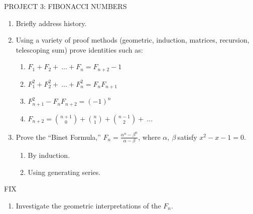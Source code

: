 \documentclass[10pt,letter]{article}
\begin{document}
PROJECT 3: FIBONACCI NUMBERS
\begin{enumerate}
\def\labelenumi{\arabic{enumi}.}

\item
  Briefly address history.
\item
  Using a variety of proof methods (geometric, induction, matrices,
  recursion, telescoping sum) prove identities such as:
\begin{enumerate}
  \def\labelenumii{\alph{enumii}.}

  \item
    \(F_{1} + F_{2} + \ \ldots + F_{n} = F_{n + 2} - 1\)
  \item
    \(F_{1}^{2} + F_{2}^{2} + \ \ldots + F_{n}^{2} = F_{n}F_{n + 1}\)
  \item
    \(F_{n + 1}^{2} - F_{n}F_{n + 2} = \left( - 1 \right)^{n}\)
  \item
    \(F_{n + 2} =
\binom{n + 1}{0}
 +
\binom{n}{1}
 +
\binom{n - 1}{2}
 + \ \ldots\)

\end{enumerate}
\item
  Prove the ``Binet Formula,''
  \(F_{n} = \frac{\alpha^{n} - \beta^{n}}{\alpha - \beta}\), where
  \(\alpha,\ \beta\ \)satisfy \(x^{2} - x - 1 = 0\).
\begin{enumerate}
  \def\labelenumii{\alph{enumii}.}

  \item
    By induction.
  \item
    Using generating series.

\end{enumerate}

\end{enumerate}
FIX
\begin{enumerate}
\def\labelenumi{\arabic{enumi}.}

\item
  Investigate the geometric interpretations of the \(F_{n}\).

\end{enumerate}
\end{document}
